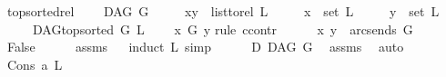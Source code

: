 \begin{isabellebody}
\isanewline
{}\isamarkupfalse%
\ top{\isacharunderscore}{\kern0pt}sorted{\isacharunderscore}{\kern0pt}rel{}{\isacharcolon}{\kern0pt}\ \isanewline
\ \ \ {\isachardoublequoteopen}DAG\ G{\isachardoublequoteclose}\isanewline
\ \ \ \ \ {\isachardoublequoteopen}{\isacharparenleft}{\kern0pt}x{\isacharcomma}{\kern0pt}y{\isacharparenright}{\kern0pt}\ {\isasymin}\ list{\isacharunderscore}{\kern0pt}to{\isacharunderscore}{\kern0pt}rel\ L{\isachardoublequoteclose}\isanewline
\ \ \ \ \ {\isachardoublequoteopen}x\ {\isasymin}\ set\ L{\isachardoublequoteclose}\isanewline
\ \ \ \ \ {\isachardoublequoteopen}y\ {\isasymin}\ set\ L{\isachardoublequoteclose}\isanewline
\ \ \ \ \ {\isachardoublequoteopen}DAG{\isachardot}{\kern0pt}top{\isacharunderscore}{\kern0pt}sorted\ G\ L{\isachardoublequoteclose}\isanewline
\ \ \ {\isachardoublequoteopen}{\isasymnot}\ x\ {\isasymrightarrow}\isactrlsup {\isacharplus}{\kern0pt}\isactrlbsub G\isactrlesub \ y{\isachardoublequoteclose}\isanewline
%
\isadelimproof
%
\endisadelimproof
%
\isatagproof
{}\isamarkupfalse%
{\isacharparenleft}{\kern0pt}rule\ ccontr{\isacharparenright}{\kern0pt}\isanewline
\ \ \isamarkupfalse%
\ {\isachardoublequoteopen}\ {\isasymnot}\ {\isacharparenleft}{\kern0pt}x{\isacharcomma}{\kern0pt}\ y{\isacharparenright}{\kern0pt}\ {\isasymnotin}\ {\isacharparenleft}{\kern0pt}arcs{\isacharunderscore}{\kern0pt}ends\ G{\isacharparenright}{\kern0pt}\isactrlsup {\isacharplus}{\kern0pt}{\isachardoublequoteclose}\isanewline
\ \ \isamarkupfalse%
\ \isamarkupfalse%
\ {\isachardoublequoteopen}False{\isachardoublequoteclose}\isanewline
\ \ \ \ \isamarkupfalse%
\ assms{\isacharparenleft}{\kern0pt}{}{\isacharcomma}{\kern0pt}{}{\isacharcomma}{\kern0pt}{}{\isacharcomma}{\kern0pt}{}{\isacharparenright}{\kern0pt}\isanewline
\ \ \isamarkupfalse%
{\isacharparenleft}{\kern0pt}induct\ L{\isacharcomma}{\kern0pt}\ simp{\isacharparenright}{\kern0pt}\isanewline
\ \ \ \ \isamarkupfalse%
\ D{\isacharcolon}{\kern0pt}\ DAG\ G\ \isamarkupfalse%
\ assms{\isacharparenleft}{\kern0pt}{}{\isacharparenright}{\kern0pt}\ \isamarkupfalse%
\ auto\isanewline
\ \ \ \ \isamarkupfalse%
\ {\isacharparenleft}{\kern0pt}Cons\ a\ L{\isacharparenright}{\kern0pt}\isanewline
\ \ \ \ \isamarkupfalse%

\end{isabellebody}
